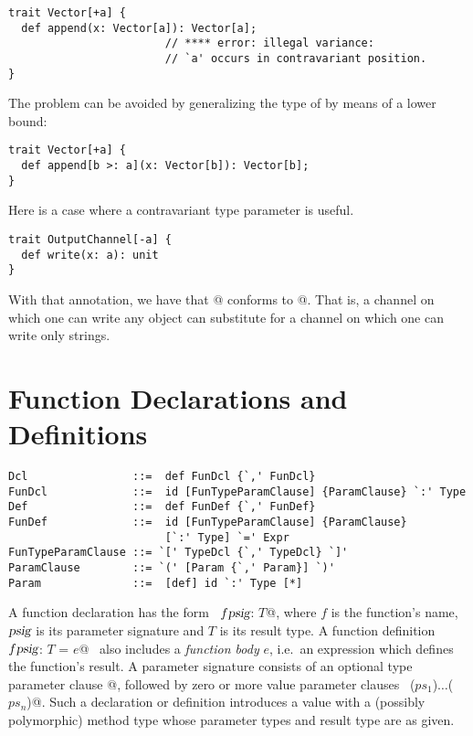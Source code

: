 \documentclass[a4paper,12pt,twoside,titlepage]{book}
\newcommand{\tps}{\mbox{\sl tps}}
\newcommand{\psig}{\mbox{\sl psig}}
\begin{document}
\begin{lstlisting}
trait Vector[+a] {
  def append(x: Vector[a]): Vector[a]; 
                        // **** error: illegal variance: 
                        // `a' occurs in contravariant position.
}
\end{lstlisting} 
The problem can be avoided by generalizing the type of 
by means of a lower bound:

\begin{lstlisting}
trait Vector[+a] {
  def append[b >: a](x: Vector[b]): Vector[b];
}
\end{lstlisting}

\example Here is a case where a contravariant type parameter is useful.

\begin{lstlisting}
trait OutputChannel[-a] {
  def write(x: a): unit
}
\end{lstlisting}
With that annotation, we have that
\lstinline@OutputChannel[Object]@ conforms to \lstinline@OutputChannel[String]@.  
That is, a
channel on which one can write any object can substitute for a channel
on which one can write only strings.

\section{Function Declarations and Definitions}
\label{sec:defdef}
\label{sec:funsigs}

\syntax\begin{lstlisting} 
Dcl                ::=  def FunDcl {`,' FunDcl} 
FunDcl             ::=  id [FunTypeParamClause] {ParamClause} `:' Type 
Def                ::=  def FunDef {`,' FunDef} 
FunDef             ::=  id [FunTypeParamClause] {ParamClause} 
                        [`:' Type] `=' Expr 
FunTypeParamClause ::= `[' TypeDcl {`,' TypeDcl} `]' 
ParamClause        ::= `(' [Param {`,' Param}] `)' 
Param              ::=  [def] id `:' Type [*]
\end{lstlisting}

A function declaration has the form ~\lstinline@def $f \psig$: $T$@, where
$f$ is the function's name, $\psig$ is its parameter
signature and $T$ is its result type. A function definition
~\lstinline@$f \psig$: $T$ = $e$@~ also includes a {\em function body} $e$,
i.e.\ an expression which defines the function's result.  A parameter
signature consists of an optional type parameter clause \lstinline@[$\tps\,$]@,
followed by zero or more value parameter clauses
~\lstinline@($ps_1$)$\ldots$($ps_n$)@.  Such a declaration or definition
introduces a value with a (possibly polymorphic) method type whose
parameter types and result type are as given.
\end{document}
